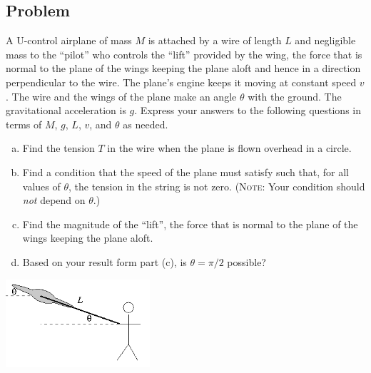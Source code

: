 \documentclass[solutions]{esg8012exam}
\begin{document}
\subsection{Problem}
  A U-control airplane of mass $M$ is attached by a wire of length $L$ and negligible mass to the ``pilot'' who controls the ``lift'' provided by the wing, the force that is normal to the plane of the wings keeping the plane aloft and hence in a direction perpendicular to the wire.  The plane's engine keeps it moving at constant speed $v$.  The wire and the wings of the plane make an angle $\theta$ with the ground.  The gravitational acceleration is $g$.  Express your answers to the following questions in terms of $M$, $g$, $L$, $v$, and $\theta$ as needed.
  \begin{enumerate}[(a)]
    \item Find the tension $T$ in the wire when the plane is flown overhead in a circle.
    \item Find a condition that the speed of the plane must satisfy such that, for all values of $\theta$, the tension in the string is not zero. (\textsc{Note}: Your condition should \emph{not} depend on $\theta$.)
    \item Find the magnitude of the ``lift'', the force that is normal to the plane of the wings keeping the plane aloft.
    \item Based on your result form part (c), is $\theta = \pi / 2$ possible?
  \end{enumerate}
  \begin{center}\includegraphics[width=0.4\textwidth]{exam1_p3_1}\end{center}
\end{document}
